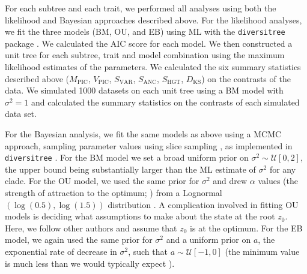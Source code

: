 \documentclass[a4paper,12pt]{article}
\begin{document}
For each subtree and each trait, we performed all analyses using both the likelihood and Bayesian approaches described above. For the likelihood analyses, we fit the three models (BM, OU, and EB) using ML with the \texttt{diversitree} package \citep{FitzJohn2012}. We calculated the AIC score for each model. We then constructed a unit tree for each subtree, trait and model combination using the maximum likelihood estimates of the parameters. We calculated the six summary statistics described above ($M_{\text{PIC}}$, $V_{\text{PIC}}$, $S_{\text{VAR}}$, $S_{\text{ANC}}$, $S_{\text{HGT}}$, $D_{\text{KS}}$) on the contrasts of the data. We simulated 1000 datasets on each unit tree using a BM model with $\sigma^2=1$ and calculated the summary statistics on the contrasts of each simulated data set. 

For the Bayesian analysis, we fit the same models as above using a MCMC approach, sampling parameter values using slice sampling \citep{Nealslice}, as implemented in  \texttt{diversitree} \citep{FitzJohn2012}. For the BM model we set a broad uniform prior on $\sigma^2 \sim \mathcal{U}[0, 2]$, the upper bound being substantially larger than the ML estimate of $\sigma^2$ for any clade. For the OU model, we used the same prior for $\sigma^2$ and drew $\alpha$ values (the strength of attraction to the optimum; \citep{Hansen1997}) from a Lognormal$(\log(0.5), \log(1.5))$ distribution \citep{UyedaBayou}. A complication involved in fitting OU models is deciding what assumptions to make about the state at the root $z_0$. Here, we follow other authors \citep{ButlerKing2004, Beaulieu2012} and assume that $z_0$ is at the optimum. For the EB model, we again used the same prior for $\sigma^2$ and a uniform prior on $a$, the exponential rate of decrease in $\sigma^2$, such that $a \sim \mathcal{U}[-1, 0]$ (the minimum value is much less than we would typically expect \citep{SlaterPennell}).
\end{document}
